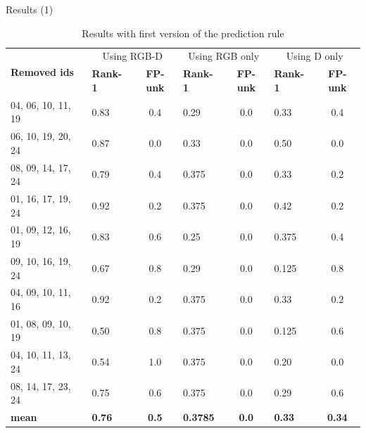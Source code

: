 \documentclass[unknownkeysallowed]{beamer}
\begin{document}
\begin{frame}{Results (1)}
	\scriptsize
	\begin{table}[]
		\centering
		\caption{Results with first version of the prediction rule}
		\begin{tabular}{|l|l|c|l|c|l|c|}
			\hline
			\multirow{2}{*}{\bf Removed ids} & \multicolumn{2}{c|}{Using RGB-D} &\multicolumn{2}{c|}{Using RGB only} &\multicolumn{2}{c|}{Using D only} \\ \cline{2-7}
							 & \bf Rank-1 & \bf FP-unk          & \bf Rank-1 & \bf FP-unk            & \bf Rank-1 & \bf FP-unk  \\ \hline
			04, 06, 10, 11, 19               & 0.83	      & 0.4                 & 0.29       & 0.0                         & 0.33       & 0.4\\ \hline
			06, 10, 19, 20, 24               & 0.87	      & 0.0                 & 0.33       & 0.0                         & 0.50       & 0.0\\ \hline
			08, 09, 14, 17, 24               & 0.79	      & 0.4                 & 0.375      & 0.0                         & 0.33       & 0.2\\ \hline
			01, 16, 17, 19, 24               & 0.92	      & 0.2                 & 0.375      & 0.0                         & 0.42       & 0.2\\ \hline
			01, 09, 12, 16, 19               & 0.83	      & 0.6                 & 0.25       & 0.0                         & 0.375      & 0.4\\ \hline
			09, 10, 16, 19, 24               & 0.67	      & 0.8                 & 0.29       & 0.0                         & 0.125      & 0.8\\ \hline
			04, 09, 10, 11, 16               & 0.92	      & 0.2                 & 0.375      & 0.0                         & 0.33       & 0.2\\ \hline
			01, 08, 09, 10, 19               & 0.50	      & 0.8                 & 0.375      & 0.0                         & 0.125      & 0.6\\ \hline
			04, 10, 11, 13, 24               & 0.54	      & 1.0                 & 0.375      & 0.0                         & 0.20       & 0.0\\ \hline
			08, 14, 17, 23, 24               & 0.75	      & 0.6                 & 0.375      & 0.0                         & 0.29       & 0.6\\ \hline
			\bf mean                         & \bf 0.76   & \bf 0.5             & \bf 0.3785 & \bf 0.0                     & \bf 0.33   & \bf 0.34\\ \hline
		\end{tabular}
	\end{table}


\end{frame}
\end{document}
